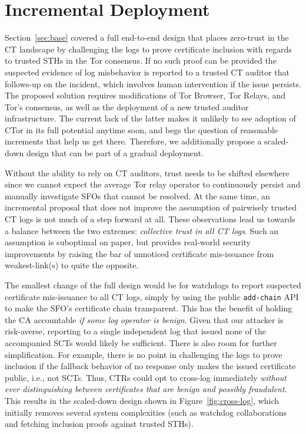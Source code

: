 \section{Incremental Deployment} \label{sec:incremental}
Section~\ref{sec:base} covered a full end-to-end design that places zero-trust
in the CT landscape by challenging the logs to prove certificate inclusion with
regards to trusted STHs in the Tor consensus.  If no such proof can be provided
the suspected evidence of log misbehavior is reported to a trusted CT auditor
that follows-up on the incident, which involves human intervention if the issue
persists.  The proposed solution requires modifications of Tor Browser, Tor
Relays, and Tor's consensus, as well as the deployment of a new trusted auditor
infrastructure.  The current lack of the latter makes it unlikely to see
adoption of CTor in its full potential anytime soon, and begs the question of
reasonable increments that help us get there.  Therefore, we additionally
propose a scaled-down design that can be part of a gradual deployment.

Without the ability to rely on CT auditors, trust needs to be shifted elsewhere
since we cannot expect the average Tor relay operator to continuously persist
and manually investigate SFOs that cannot be resolved.  At the same time, an
incremental proposal that does not improve the assumption of pairwisely trusted
CT logs is not much of a step forward at all.  These observations lead us
towards a balance between the two extremes:
	\emph{collective trust in all CT logs}.
Such an assumption is suboptimal on paper, but provides real-world security
improvements by raising the bar of unnoticed certificate mis-issuance from
weakest-link(s) to quite the opposite.

The smallest change of the full design would be for watchdogs to report
suspected certificate mis-issuance to all CT logs, simply by using the public
\texttt{add-chain} API to make the SFO's certificate chain transparent.  This
has the benefit of holding the CA accountable \emph{if some log operator is
benign}.  Given that our attacker is risk-averse, reporting to a single
independent log that issued none of the accompanied SCTs would likely be
sufficient.  There is also room for further simplification.  For example, there
is no point in challenging the logs to prove inclusion if the fallback behavior
of no response only makes the issued certificate public, i.e., not SCTs.
Thus, CTRs could opt to cross-log immediately \emph{without ever distinguishing
between certificates that are benign and possibly fraudulent}.  This results in
the scaled-down design shown in Figure~\ref{fig:cross-log}, which initially
removes several system complexities (such as watchdog collaborations and
fetching inclusion proofs against trusted STHs).

